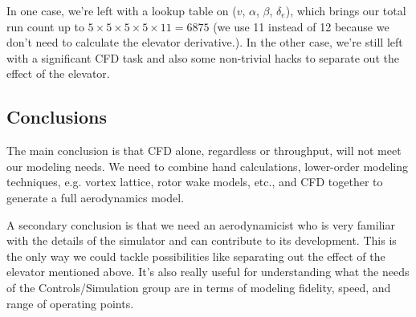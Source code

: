 \documentclass[11pt]{amsart}
\begin{document}
In one case, we're left with a lookup table on ($v$, $\alpha$,
$\beta$, $\delta_e$), which brings our total run count up to $5 \times
5 \times 5 \times 5 \times 11 = 6875$ (we use 11 instead of 12 because
we don't need to calculate the elevator derivative.).  In the other
case, we're still left with a significant CFD task and also some
non-trivial hacks to separate out the effect of the elevator.

\subsection{Conclusions}

The main conclusion is that CFD alone, regardless or throughput, will
not meet our modeling needs.  We need to combine hand calculations,
lower-order modeling techniques, e.g. vortex lattice, rotor wake
models, etc., and CFD together to generate a full aerodynamics model.

A secondary conclusion is that we need an aerodynamicist who is very
familiar with the details of the simulator and can contribute to its
development.  This is the only way we could tackle possibilities like
separating out the effect of the elevator mentioned above.  It's also
really useful for understanding what the needs of the
Controls/Simulation group are in terms of modeling fidelity, speed,
and range of operating points.
\end{document}
